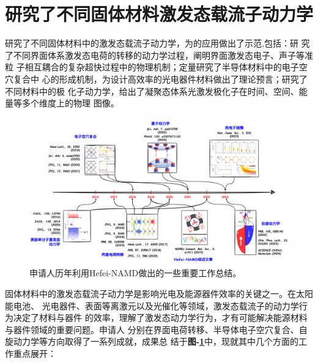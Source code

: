 \section{研究了不同固体材料激发态载流子动力学}
\begin{center}
  \begin{InnovationBox}
    研究了不同固体材料中的激发态载流子动力学，为\hnamd{}的应用做出了示范,包括：研
    究了不同界面体系激发态电荷的转移的动力学过程，阐明界面激发态电子、声子等准粒
    子相互耦合的复杂超快过程中的物理机制；定量研究了半导体材料中的电子空穴复合中
    心的形成机制，为设计高效率的光电器件材料做出了理论预言；研究了不同材料中的极
    化子动力学，给出了凝聚态体系光激发极化子在时间、空间、能量等多个维度上的物理
    图像。
  \end{InnovationBox}
\end{center}

\begin{figure}
  \centering
  \includegraphics[width=1.\linewidth]{figs/rep_work.pdf}
  \caption{\label{fig:fig_rep_work}
    \kaishu{}%
    申请人历年利用Hefei-NAMD做出的一些重要工作总结。
  }
\end{figure}


固体材料中的激发态载流子动力学是影响光电及能源器件效率的关键之一。在太阳能电池、
光电器件、表面等离激元以及光催化等领域，激发态载流子的动力学行为决定了材料与器件
的效率，理解了激发态动力学行为，才有可能解决能源材料与器件领域的重要问题。申请人
分别在界面电荷转移、半导体电子空穴复合、自旋动力学等方向取得了一系列成就，成果总
结于\textbf{图-\ref{fig:fig_rep_work}}中，现就其中几个方面的工作重点展开：

